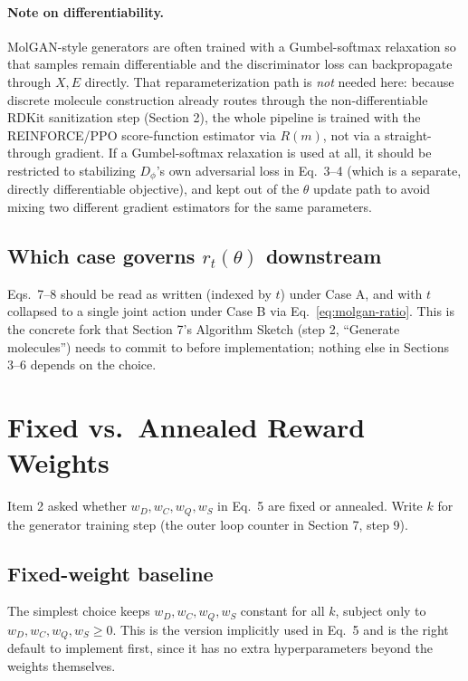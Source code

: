 \documentclass[11pt]{article}
\newcommand{\1}{\mathbb{1}}
\begin{document}
\paragraph{Note on differentiability.} MolGAN-style generators are
often trained with a Gumbel-softmax relaxation so that samples remain
differentiable and the discriminator loss can backpropagate through
$X, E$ directly. That reparameterization path is \emph{not} needed
here: because discrete molecule construction already routes through
the non-differentiable RDKit sanitization step (Section 2), the whole
pipeline is trained with the REINFORCE/PPO score-function estimator
via $R(m)$, not via a straight-through gradient. If a Gumbel-softmax
relaxation is used at all, it should be restricted to stabilizing
$D_\phi$'s own adversarial loss in Eq.~3--4 (which is a separate,
directly differentiable objective), and kept out of the $\theta$
update path to avoid mixing two different gradient estimators for
the same parameters.

\subsection{Which case governs $r_t(\theta)$ downstream}

Eqs.~7--8 should be read as written (indexed by $t$) under Case A,
and with $t$ collapsed to a single joint action under Case B via
Eq.~\eqref{eq:molgan-ratio}. This is the concrete fork that Section
7's Algorithm Sketch (step 2, ``Generate molecules'') needs to commit
to before implementation; nothing else in Sections 3--6 depends on
the choice.

\section{Fixed vs.\ Annealed Reward Weights}
\label{sec:weight-schedule}

Item 2 asked whether $w_D, w_C, w_Q, w_S$ in Eq.~5 are fixed or
annealed. Write $k$ for the generator training step (the outer loop
counter in Section 7, step 9).

\subsection{Fixed-weight baseline}
The simplest choice keeps $w_D, w_C, w_Q, w_S$ constant for all $k$,
subject only to $w_D, w_C, w_Q, w_S \ge 0$. This is the version
implicitly used in Eq.~5 and is the right default to implement first,
since it has no extra hyperparameters beyond the weights themselves.
\end{document}
